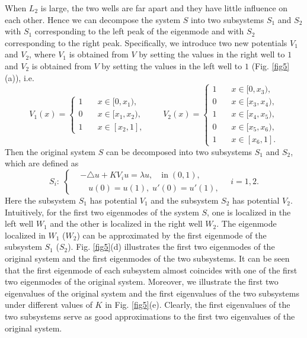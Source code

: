 \documentclass[a4paper,11pt]{article}
\begin{document}
When $L_2$ is large, the two wells are far apart and they have little influence on each other. Hence we can decompose the system $S$ into two subsystems $S_1$ and $S_2$ with $S_1$ corresponding to the left peak of the eigenmode and with $S_2$ corresponding to the right peak. Specifically, we introduce two new potentials $V_1$ and $V_2$, where $V_1$ is obtained from $V$ by setting the values in the right well to $1$ and $V_2$ is obtained from $V$ by setting the values in the left well to $1$ (Fig. \ref{fig5}(a)), i.e.
\begin{equation*}
V_1(x) = \left\{
\begin{split}
1 & \quad x \in [0, x_1), \\
0 & \quad x \in [x_1, x_2), \\
1 & \quad x \in [x_2, 1],
\end{split}
\right.
\qquad
V_2(x) = \left\{
\begin{split}
1 & \quad x \in [0, x_3), \\
0 & \quad x \in [x_3, x_4), \\
1 & \quad x \in [x_4, x_5), \\
0 & \quad x \in [x_5, x_6), \\
1 & \quad x \in [x_6, 1].
\end{split}
\right.
\end{equation*}
Then the original system $S$ can be decomposed into two subsystems $S_1$ and $S_2$, which are defined as
\begin{equation}
S_i: \;
\left\{
\begin{split}
& -\triangle u + K V_i u = \lambda u, \quad \textrm{in} \; (0, 1), \\
& \quad u(0) = u(1), \; u'(0) =  u'(1),
\end{split}
\right.
\quad
i = 1, 2.
\end{equation}
Here the subsystem $S_1$ has potential $V_1$ and the subsystem $S_2$ has potential $V_2$. Intuitively, for the first two eigenmodes of the system $S$, one is localized in the left well $W_1$ and the other is localized in the right well $W_2$. The eigenmode localized in $W_1$ ($W_2$) can be approximated by the first eigenmode of the subsystem $S_1$ ($S_2$). Fig. \ref{fig5}(d) illustrates the first two eigenmodes of the original system and the first eigenmodes of the two subsystems. It can be seen that the first eigenmode of each subsystem almost coincides with one of the first two eigenmodes of the original system. Moreover, we illustrate the first two eigenvalues of the original system and the first eigenvalues of the two subsystems under different values of $K$ in Fig. \ref{fig5}(e). Clearly, the first eigenvalues of the two subsystems serve as good approximations to the first two eigenvalues of the original system.
\end{document}

